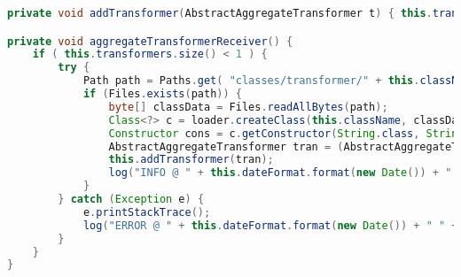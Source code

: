 \begin{lstlisting}[language=Java, label=atr, caption={Metodene \emph{addTransformer} og \emph{aggregateTransformerReceiver}.}]
private void addTransformer(AbstractAggregateTransformer t) { this.transformers.put(t.getAppVersion(), t); }

private void aggregateTransformerReceiver() {
    if ( this.transformers.size() < 1 ) {
        try {
            Path path = Paths.get( "classes/transformer/" + this.className.replace(".","/") + ".class").toAbsolutePath();
            if (Files.exists(path)) {
                byte[] classData = Files.readAllBytes(path);
                Class<?> c = loader.createClass(this.className, classData);
                Constructor cons = c.getConstructor(String.class, String.class);
                AbstractAggregateTransformer tran = (AbstractAggregateTransformer) cons.newInstance( "x", "y" );
                this.addTransformer(tran);
                log("INFO @ " + this.dateFormat.format(new Date()) + " - Received aggregate transformer for schema " + tran.getAppVersion() + "\n");
            }
        } catch (Exception e) {
            e.printStackTrace();
            log("ERROR @ " + this.dateFormat.format(new Date()) + " " + e.toString() + "\n");
        }
    }
}
\end{lstlisting}
